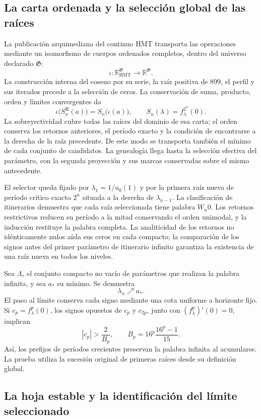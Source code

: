 \subsection{La carta ordenada y la selección global de las raíces}

La publicación arquimediana del continuo HMT transporta las operaciones
mediante un isomorfismo de cuerpos ordenados completos, dentro del universo
declarado \(\mathfrak G\):
\[
\iota:\mathbb R_{\mathrm{HMT}}^{\mathfrak G}
\longrightarrow\mathbb R^{\mathfrak G}.
\]
La construcción interna del coseno por su serie, la raíz positiva de 899,
el perfil y sus iterados precede a la selección de ceros. La conservación
de suma, producto, orden y límites convergentes da
\[
\iota\bigl(S_n^{\mathrm H}(a)\bigr)=S_n\bigl(\iota(a)\bigr),
\qquad S_n(\lambda)=f_\lambda^{2^n}(0).
\]
La sobreyectividad cubre todas las raíces del dominio de esa carta; el orden
conserva los retornos anteriores, el período exacto y la condición de
encontrarse a la derecha de la raíz precedente. De este modo se transporta
también el mínimo de cada conjunto de candidatos. La genealogía llega
hasta la selección efectiva del parámetro, con la segunda proyección y sus
marcas conservadas sobre el mismo antecedente.

El selector queda fijado por \(\lambda_1=1/u_0(1)\) y por la primera raíz
nueva de período crítico exacto \(2^n\) situada a la derecha de
\(\lambda_{n-1}\). La clasificación de itinerarios demuestra que cada raíz
seleccionada tiene palabra \(W_n0\). Los retornos restrictivos reducen su
período a la mitad conservando el orden unimodal, y la inducción restituye
la palabra completa. La analiticidad de los retornos no idénticamente nulos
aísla sus ceros en cada compacto; la
comparación de los signos antes del primer parámetro de itinerario infinito
garantiza la existencia de una raíz nueva en todos los niveles.

Sea \(\Lambda_\tau\) el conjunto compacto no vacío de parámetros que realizan
la palabra infinita, y sea \(a_*\) su mínimo. Se demuestra
\[
\lambda_n\nearrow a_*.
\]
El paso al límite conserva cada signo mediante una cota uniforme a horizonte
fijo. Si \(c_p=f_\lambda^p(0)\), los signos opuestos de \(c_p\) y
\(c_{2p}\), junto con \((f_\lambda^p)'(0)=0\), implican
\[
|c_p|>\frac2{B_p},\qquad
B_p=16^p\frac{16^p-1}{15}.
\]
Así, los prefijos de períodos crecientes preservan la palabra infinita al
acumularse. La prueba utiliza la sucesión original de primeras raíces desde
su definición global.

\subsection{La hoja estable y la identificación del límite seleccionado}

